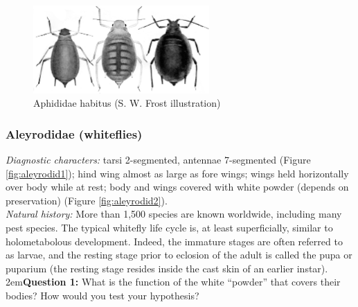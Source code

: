 \documentclass[letterpaper, 11pt]{article}
\begin{document}
\begin{figure}[ht!]
 \centering
 \includegraphics[width=0.6\textwidth]{aphids.png}
 \caption{Aphididae habitus (S. W. Frost illustration)}
 \label{fig:aphid1}
\end{figure}

\subsubsection{Aleyrodidae (whiteflies)}
\noindent{}\textit{Diagnostic characters:} tarsi 2-segmented, antennae 7-segmented (Figure \ref{fig:aleyrodid1}); hind wing almost as large as fore wings; wings held horizontally over body while at rest; body and wings covered with white powder (depends on preservation) (Figure \ref{fig:aleyrodid2}).\\

\noindent{}\textit{Natural history:} More than 1,500 species are known worldwide, including many pest species. The typical whitefly life cycle is, at least superficially, similar to holometabolous development. Indeed, the immature stages are often referred to as larvae, and the resting stage prior to eclosion of the adult is called the pupa or puparium (the resting stage resides inside the cast skin of an earlier instar).\\

\hangindent2em\textbf{Question 1:} What is the function of the white ``powder'' that covers their bodies? How would you test your hypothesis? \\
\end{document}
